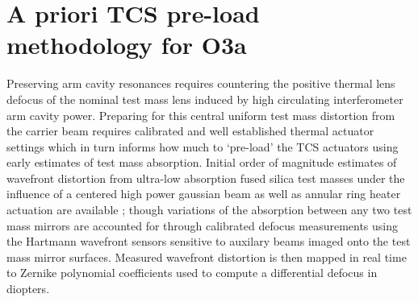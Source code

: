 \section{A priori TCS pre-load methodology for O3a}
Preserving arm cavity resonances requires countering the positive thermal lens defocus of the nominal test mass lens induced by high circulating interferometer arm cavity power. Preparing for this central uniform test mass distortion from the carrier beam requires calibrated and well established thermal actuator settings which in turn informs how much to `pre-load' the TCS actuators using early estimates of test mass absorption. Initial order of magnitude estimates of wavefront distortion from ultra-low absorption fused silica test masses under the influence of a centered high power gaussian beam as well as annular ring heater actuation are available \cite{hellovinet:1990, ramette:2016}; though variations of the absorption between any two test mass mirrors are accounted for through calibrated defocus measurements using the Hartmann wavefront sensors sensitive to auxilary beams imaged onto the test mass mirror surfaces. Measured wavefront distortion is then mapped in real time to Zernike polynomial coefficients used to compute a differential defocus in diopters.

